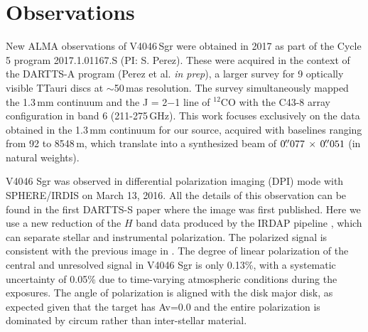 \documentclass[letters,usenatbib,times]{mnras}
\begin{document}
\section{Observations} \label{sec:Observations}


New ALMA observations of V4046\,Sgr were obtained in 2017 as part of the Cycle 5 program 2017.1.01167.S (PI: S. Perez). These were acquired in the context of the DARTTS-A program (Perez et al. {\em in prep}), a larger survey for 9 optically visible TTauri discs at $\sim$50\,mas resolution. The survey simultaneously mapped the 1.3\,mm continuum and the J = 2$-$1 line of $^{12}$CO with the C43-8 array configuration in band 6 (211-275\,GHz). This work focuses exclusively on the data obtained in the 1.3\,mm continuum for our source, acquired with baselines ranging from 92 to 8548\,m, which translate into a synthesized beam of $0\hbox{$.\!\!^{\prime\prime}$}077 \,\times \, 0\hbox{$.\!\!^{\prime\prime}$}051$ (in natural weights).

V4046 Sgr was observed in differential polarization imaging (DPI) mode with SPHERE/IRDIS on March 13, 2016. All the details of this observation can be found in the first DARTTS-S paper \citep{Avenhaus_2018} where the image was first published. Here we use a new reduction of the $H$ band data produced by the IRDAP pipeline \citep{2020A&A...633A..64V}, which can separate stellar and instrumental polarization. The polarized signal is consistent with the previous image in \citet{Avenhaus_2018}. The degree of linear polarization of the central and unresolved signal in V4046 Sgr is only 0.13\%, with a systematic uncertainty of 0.05\% due to time-varying atmospheric conditions during the exposures. The angle of polarization is aligned with the disk major disk, as expected given that the target has Av=0.0 \citep{2016ApJ...828...69M} and the entire polarization is dominated by circum rather than inter-stellar material. 
\end{document}
